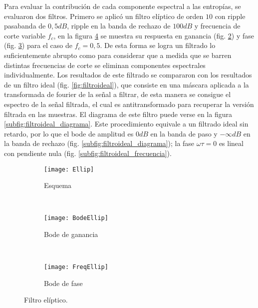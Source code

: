Para evaluar la contribución de cada componente espectral a las entropías, se evaluaron dos filtros. Primero se aplicó un filtro elíptico de orden $10$ con ripple pasabanda de $0,5 dB$, ripple en la banda de rechazo de $100 dB$ y frecuencia de corte variable $f_c$, en la figura \ref{fig:filtroellip} se muestra su respuesta en ganancia (fig. \ref{subfig:filtroellip_amplitud}) y fase (fig. \ref{subfig:filtroellip_frecuencia}) para el caso de $f_c=0,5$. De esta forma se logra un filtrado lo suficientemente abrupto como para considerar que a medida que se barren distintas frecuencias de corte se eliminan componentes espectrales individualmente.
Los resultados de este filtrado se compararon con los resultados de un filtro ideal (fig. \ref{fig:filtroideal}), que consiste en una máscara aplicada a la transformada de fourier de la señal a filtrar, de esta manera se consigue el espectro de la señal filtrada, el cual es antitransformado para recuperar la versión filtrada en las muestras. El diagrama de este filtro puede verse en la figura \ref{subfig:filtroideal_diagrama}. Este procedimiento equivale a un filtrado ideal sin retardo, por lo que el bode de amplitud es $0dB$ en la banda de paso y $-\infty dB$ en la banda de rechazo (fig. \ref{subfig:filtroideal_diagrama}); la fase $\omega\tau=0$ es lineal con pendiente nula (fig. \ref{subfig:filtroideal_frecuencia}).
%
\begin{figure}[h]
    \centering
    \begin{subfigure}[t]{0.32\textwidth}
        \texttt{[image: Ellip]}
        \caption{Esquema}
        \label{subfig:filtroellip_diagrama}
    \end{subfigure}
    ~ %
    \begin{subfigure}[t]{0.32\textwidth}
        \texttt{[image: BodeEllip]}
        \caption{Bode de ganancia}
        \label{subfig:filtroellip_amplitud}
    \end{subfigure}
    ~ %
    \begin{subfigure}[t]{0.32\textwidth}
        \texttt{[image: FreqEllip]}
        \caption{Bode de fase}
        \label{subfig:filtroellip_frecuencia}
    \end{subfigure}
    \caption{Filtro elíptico.}\label{fig:filtroellip}
\end{figure}
